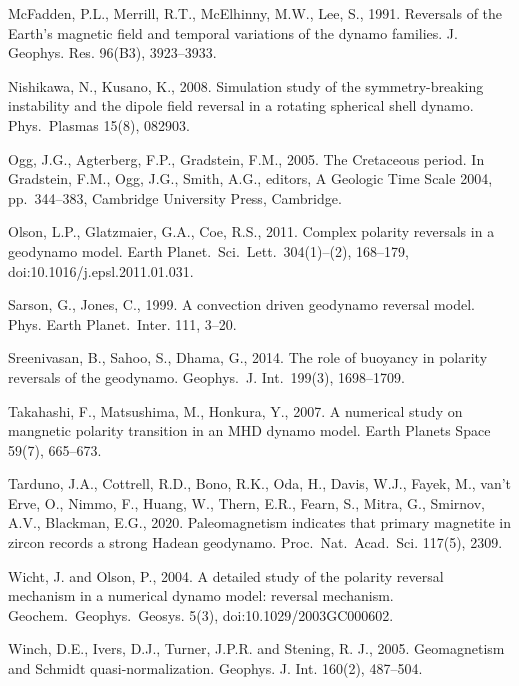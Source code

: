 \begin{list}
%
\item
McFadden, P.L., Merrill, R.T., McElhinny, M.W., Lee, S., 1991. Reversals of the Earth's magnetic field and temporal variations of the dynamo families. J. Geophys. Res. 96(B3), 3923--3933.
%
\item
Nishikawa, N., Kusano, K., 2008. Simulation study of the symmetry-breaking instability and the dipole field reversal in a rotating spherical shell dynamo. Phys.\ Plasmas 15(8), 082903.
%
\item
Ogg, J.G., Agterberg, F.P., Gradstein, F.M., 2005. The Cretaceous period. In Gradstein, F.M., Ogg, J.G., Smith, A.G., editors, A Geologic Time Scale 2004, pp.\ 344--383, Cambridge University Press, Cambridge.
%
\item
\sloppy
Olson, L.P., Glatzmaier, G.A., Coe, R.S., 2011. Complex polarity reversals in a geodynamo model. Earth Planet.\ Sci.\ Lett.\ 304(1)--(2), 168--179, doi:10.1016/j.epsl.2011.01.031.
%
\item
Sarson, G., Jones, C., 1999. A convection driven geodynamo reversal model. Phys. Earth Planet.\ Inter. 111, 3--20.
%
\item
Sreenivasan, B., Sahoo, S., Dhama, G., 2014. The role of buoyancy in polarity reversals of the geodynamo. Geophys.\ J. Int.\ 199(3), 1698--1709.
%
\item
Takahashi, F., Matsushima, M., Honkura, Y., 2007. A numerical study on mangnetic polarity transition in an MHD dynamo model. Earth Planets Space 59(7), 665--673.
%
\item
Tarduno, J.A., Cottrell, R.D., Bono, R.K., Oda, H., Davis, W.J., Fayek, M., van't Erve, O., Nimmo, F., Huang, W., Thern, E.R., Fearn, S., Mitra, G., Smirnov, A.V., Blackman, E.G., 2020. Paleomagnetism indicates that primary magnetite in zircon records a strong Hadean geodynamo. Proc.\ Nat.\ Acad.\ Sci. 117(5), 2309.
%
\item
Wicht, J. and Olson, P., 2004. A detailed study of the polarity reversal mechanism in a numerical dynamo model: reversal mechanism. Geochem.\ Geophys.\ Geosys. 5(3), doi:10.1029/2003GC000602.
%
\item
Winch, D.E., Ivers, D.J., Turner, J.P.R. and Stening, R. J., 2005. Geomagnetism and Schmidt quasi-normalization. Geophys. J. Int. 160(2), 487--504.
%
\end{list}